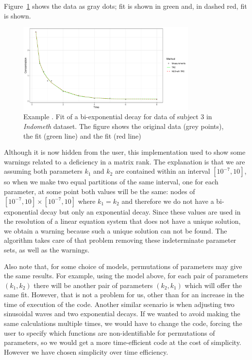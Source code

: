 Figure~\ref{fig:two_exponentials} shows the data as gray dots;  fit is shown in green and, in dashed red,  fit is shown. 

\begin{figure}[htb]
\centering
\includegraphics[width=0.8\textwidth]{example2.pdf}
\caption{Example . Fit of a bi-exponential decay for data of subject 3 in \textit{Indometh} dataset. The figure shows the original data (grey points), the  fit (green line) and the  fit (red line)}
\label{fig:two_exponentials}
\end{figure}


Although it is now hidden from the user, this implementation used to show some warnings related to a deficiency in a matrix rank. The explanation is that we are assuming both parameters $k_1$ and $k_2$ are contained within an interval $[10^{-7},10]$, so when we make two equal partitions of the same interval, one for each parameter, at some point both values will be the same: nodes of $[10^{-7},10] \times [10^{-7},10]$ where $k_1=k_2$ and therefore we do not have a bi-exponential decay but only an exponential decay. Since these values are used in the resolution of a linear equation system that does not have a unique solution, we obtain a warning because such a unique solution can not be found. The algorithm takes care of that problem removing these indeterminate parameter sets, as well as the warnings.

Also note that, for some choice of models, permutations of parameters may give the same results. For example, using the model above, for each pair of parameters $(k_1,k_2)$ there will be another pair of parameters $(k_2,k_1)$ which will offer the same fit. However, that is not a problem for us, other than for an increase in the time of execution of the code. Another similar scenario is when adjusting two sinusoidal waves and two exponential decays. If we wanted to avoid making the same calculations multiple times, we would have to change the code, forcing the user to specify which functions are non-identifiable for permutations of parameters, so we would get a more time-efficient code at the cost of simplicity. However we have chosen simplicity over time efficiency.



